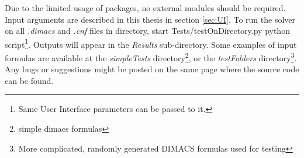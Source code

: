 \documentclass[12pt,english,pdflatex]{aghdpl}
\begin{document}
Due to the limited usage of packages, no external modules should be required. Input arguments are described in this thesis in section \ref{sec:UI}. To run the solver on all \textit{.dimacs} and \textit{.cnf} files in directory, start Tests/testOnDirectory.py python script\footnote{Same User Interface parameters can be passed to it.}. Outputs will appear in the \textit{Results} sub-directory. Some examples of input formulas are available at the \textit{simpleTests} directory\footnote{simple dimacs formulas}, or the \textit{testFolders} directory\footnote{More complicated, randomly generated DIMACS formulas used for testing}. Any bugs or suggestions might be posted on the same page where the source code can be found.


%
\end{document}
